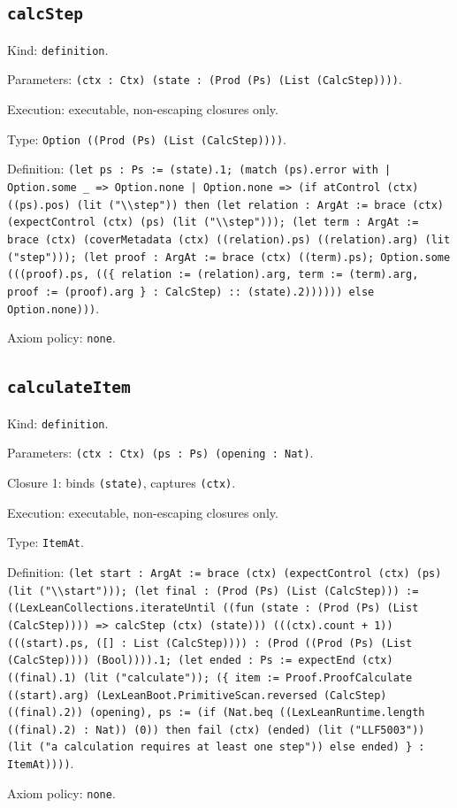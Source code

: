 \documentclass[11pt]{article}
\begin{document}
\subsection*{\texttt{calcStep}}
\noindent Kind: \texttt{definition}.\par
\noindent Parameters: \texttt{(ctx : Ctx) (state : (Prod (Ps) (List (CalcStep))))}.\par
\noindent Execution: executable, non-escaping closures only.\par
\noindent Type: \texttt{Option ((Prod (Ps) (List (CalcStep))))}.\par
\noindent Definition: \texttt{(let ps : Ps := (state).1; (match (ps).error with | Option.some \_ => Option.none | Option.none => (if atControl (ctx) ((ps).pos) (lit ("\textbackslash{}\textbackslash{}step")) then (let relation : ArgAt := brace (ctx) (expectControl (ctx) (ps) (lit ("\textbackslash{}\textbackslash{}step"))); (let term : ArgAt := brace (ctx) (coverMetadata (ctx) ((relation).ps) ((relation).arg) (lit ("step"))); (let proof : ArgAt := brace (ctx) ((term).ps); Option.some (((proof).ps, ((\{ relation := (relation).arg, term := (term).arg, proof := (proof).arg \} : CalcStep) :: (state).2)))))) else Option.none)))}.\par
\noindent Axiom policy: \texttt{none}.\par
\subsection*{\texttt{calculateItem}}
\noindent Kind: \texttt{definition}.\par
\noindent Parameters: \texttt{(ctx : Ctx) (ps : Ps) (opening : Nat)}.\par
\noindent Closure 1: binds \texttt{(state)}, captures \texttt{(ctx)}.\par
\noindent Execution: executable, non-escaping closures only.\par
\noindent Type: \texttt{ItemAt}.\par
\noindent Definition: \texttt{(let start : ArgAt := brace (ctx) (expectControl (ctx) (ps) (lit ("\textbackslash{}\textbackslash{}start"))); (let final : (Prod (Ps) (List (CalcStep))) := ((LexLeanCollections.iterateUntil ((fun (state : (Prod (Ps) (List (CalcStep)))) => calcStep (ctx) (state))) (((ctx).count + 1)) (((start).ps, ([] : List (CalcStep)))) : (Prod ((Prod (Ps) (List (CalcStep)))) (Bool)))).1; (let ended : Ps := expectEnd (ctx) ((final).1) (lit ("calculate")); (\{ item := Proof.ProofCalculate ((start).arg) (LexLeanBoot.PrimitiveScan.reversed (CalcStep) ((final).2)) (opening), ps := (if (Nat.beq ((LexLeanRuntime.length ((final).2) : Nat)) (0)) then fail (ctx) (ended) (lit ("LLF5003")) (lit ("a calculation requires at least one step")) else ended) \} : ItemAt))))}.\par
\noindent Axiom policy: \texttt{none}.\par
\end{document}
